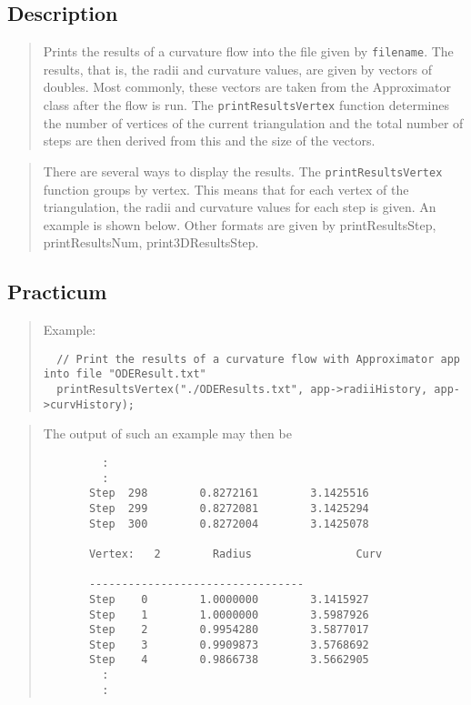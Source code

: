 \documentclass[10pt]{article}%
\begin{document}
\subsection*{Description}

\begin{quotation} Prints the results of a curvature flow into the file given by \texttt{filename}. The results, that is, the radii and curvature values, are given by vectors of doubles. Most commonly, these vectors are taken from the Approximator class after the flow is run. The \texttt{printResultsVertex} function determines the number of vertices of the current triangulation and the total number of steps are then derived from this and the size of the vectors.\end{quotation}
\begin{quotation} There are several ways to display the results. The \texttt{printResultsVertex} function groups by vertex. This means that for each vertex of the triangulation, the radii and curvature values for each step is given. An example is shown below. Other formats are given by printResultsStep, printResultsNum, print3DResultsStep.\end{quotation}

\subsection*{Practicum}

\begin{quotation} Example:{\small{\begin{verbatim} 
  // Print the results of a curvature flow with Approximator app into file "ODEResult.txt"
  printResultsVertex("./ODEResults.txt", app->radiiHistory, app->curvHistory);
  \end{verbatim}
}}
\end{quotation}\begin{quotation} The output of such an example may then be{\small{\begin{verbatim} 
         : 
         :
       Step  298        0.8272161        3.1425516
       Step  299        0.8272081        3.1425294
       Step  300        0.8272004        3.1425078

       Vertex:   2        Radius                Curv

       ---------------------------------
       Step    0        1.0000000        3.1415927
       Step    1        1.0000000        3.5987926
       Step    2        0.9954280        3.5877017
       Step    3        0.9909873        3.5768692
       Step    4        0.9866738        3.5662905
         :
         :
  \end{verbatim}
}}
\end{quotation}
\end{document}
